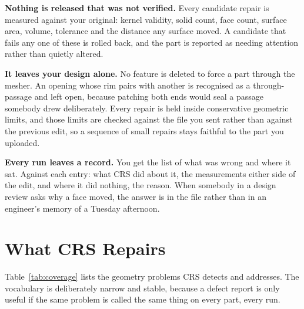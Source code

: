 \documentclass[10pt,onecolumn]{article}
\newcommand{\topic}[1]{\textbf{#1.}\hspace{0.5em}\ignorespaces}
\begin{document}
\topic{Nothing is released that was not verified} Every candidate repair is measured against your
original: kernel validity, solid count, face count, surface area, volume, tolerance and the
distance any surface moved. A candidate that fails any one of these is rolled back, and the part is
reported as needing attention rather than quietly altered.

\topic{It leaves your design alone} No feature is deleted to force a part through the mesher. An
opening whose rim pairs with another is recognised as a through-passage and left open, because
patching both ends would seal a passage somebody drew deliberately. Every repair is held inside
conservative geometric limits, and those limits are checked against the file you sent rather than
against the previous edit, so a sequence of small repairs stays faithful to the part you
uploaded.

\topic{Every run leaves a record} You get the list of what was wrong and where it sat. Against each
entry: what CRS did about it, the measurements either side of the edit, and where it did nothing,
the reason. When somebody in a design review asks why a face moved, the answer is in the file
rather than in an engineer's memory of a Tuesday afternoon.

\section{What CRS Repairs}

Table~\ref{tab:coverage} lists the geometry problems CRS detects and addresses. The vocabulary is
deliberately narrow and stable, because a defect report is only useful if the same problem is
called the same thing on every part, every run.
\end{document}
